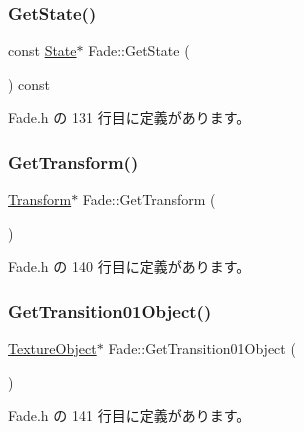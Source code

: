 \subsubsection{\texorpdfstring{Get\+State()}{GetState()}}
{\footnotesize\ttfamily const \mbox{\hyperlink{class_fade_ae77826bf3ff2ab95fb7b3b6f95cba80a}{State}}$\ast$ Fade\+::\+Get\+State (\begin{DoxyParamCaption}{ }\end{DoxyParamCaption}) const\hspace{0.3cm}{\ttfamily [inline]}}



 Fade.\+h の 131 行目に定義があります。

\mbox{\label{class_fade_a1a177209e72a27858ceb2d339321e9c4}} 
\subsubsection{\texorpdfstring{Get\+Transform()}{GetTransform()}}
{\footnotesize\ttfamily \mbox{\hyperlink{class_transform}{Transform}}$\ast$ Fade\+::\+Get\+Transform (\begin{DoxyParamCaption}{ }\end{DoxyParamCaption})\hspace{0.3cm}{\ttfamily [inline]}}



 Fade.\+h の 140 行目に定義があります。

\mbox{\label{class_fade_a4e047c532d430095e7d0d70288289a82}} 
\subsubsection{\texorpdfstring{Get\+Transition01\+Object()}{GetTransition01Object()}}
{\footnotesize\ttfamily \mbox{\hyperlink{class_texture_object}{Texture\+Object}}$\ast$ Fade\+::\+Get\+Transition01\+Object (\begin{DoxyParamCaption}{ }\end{DoxyParamCaption})\hspace{0.3cm}{\ttfamily [inline]}}



 Fade.\+h の 141 行目に定義があります。

